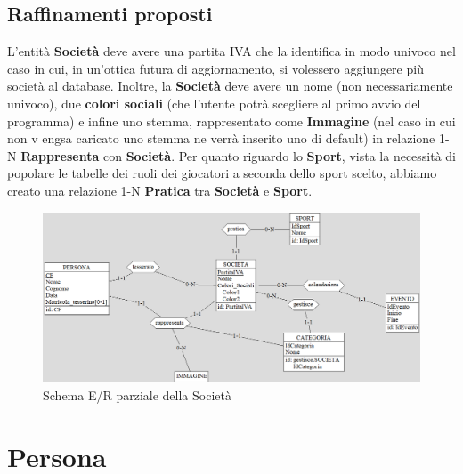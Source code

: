 \documentclass[a4paper,12pt]{report}
\begin{document}
\subsection{Raffinamenti proposti}

L'entità \textbf{Società} deve avere una partita IVA che la identifica in modo univoco nel caso in cui, in un'ottica futura di aggiornamento, si volessero aggiungere più società al database. Inoltre, la \textbf{Società} deve avere un nome (non necessariamente univoco), due \textbf{colori sociali} (che l'utente potrà scegliere al primo avvio del programma) e infine uno stemma, rappresentato come \textbf{Immagine} (nel caso in cui non v engsa caricato uno stemma ne verrà inserito uno di default) in relazione 1-N \textbf{Rappresenta} con \textbf{Società}. \newline \newline
Per quanto riguardo lo \textbf{Sport}, vista la necessità di popolare le tabelle dei ruoli dei giocatori a seconda dello sport scelto, abbiamo creato una relazione 1-N \textbf{Pratica} tra \textbf{Società} e \textbf{Sport}.

\begin{figure}[htp]
    \centering
    \includegraphics[width = \textwidth]{GSS_report/img/societa_raffinamento.png}
    \caption{Schema E/R parziale della Società}
\end{figure}

\newpage
\section{Persona}
\end{document}
